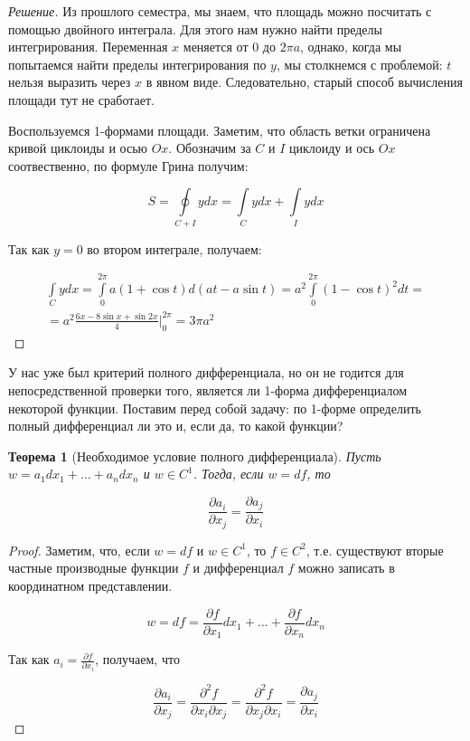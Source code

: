 \documentclass[a5paper]{article}
\newcounter{through}
\theoremstyle{plain}
\newtheorem{theorem}[through]{Теорема}
\theoremstyle{definition}
\numberwithin{through}{section}
\numberwithin{equation}{section}
\begin{document}
\begin{proof}[Решение]
	Из прошлого семестра, мы знаем, что площадь можно посчитать с помощью двойного интеграла. Для этого нам нужно найти пределы интегрирования. Переменная $x$ меняется от $0$ до $2\pi a$, однако, когда мы попытаемся найти пределы интегрирования по $y$, мы столкнемся с проблемой: $t$ нельзя выразить через $x$ в явном виде. Следовательно, старый способ вычисления площади тут не сработает.
	
	Воспользуемся 1-формами площади. Заметим, что область ветки ограничена кривой циклоиды и осью $Ox$. Обозначим за $C$ и $I$ циклоиду и ось $Ox$ соотвественно, по формуле Грина получим:
	
	\begin{equation*}
		S = \oint\limits_{C + I}ydx =\int\limits_{C}ydx + \int\limits_{I}ydx
	\end{equation*}

	Так как $y = 0$ во втором интеграле, получаем:
	
	\begin{multline*}
	\int\limits_{C}ydx = \int\limits_{0}^{2\pi}a(1+\cos t) d(at - a\sin t) = a^2 \int\limits_{0}^{2\pi} (1-\cos t)^2dt = \\= a^2 \frac{6x - 8 \sin x + \sin 2x}{4} \bigg|_0^{2\pi} = 3 \pi a^2
	\end{multline*}
\end{proof}

У нас уже был критерий полного дифференциала, но он не годится для непосредственной проверки того, является ли 1-форма дифференциалом некоторой функции. Поставим перед собой задачу: по 1-форме определить полный дифференциал ли это и, если да, то какой функции?

\begin{theorem}[Необходимое условие полного дифференциала]
	Пусть $w = a_1 dx_1 + \ldots + a_n dx_n$ и $w \in C^1$. Тогда, если $w = df$, то 
	
	\begin{equation*}
		\frac{\partial a_i}{\partial x_j} = \frac{\partial a_j}{\partial x_i}
	\end{equation*}
\end{theorem}

\begin{proof}
	Заметим, что, если $w = df$ и $w \in C^1$, то $f \in C^2$, т.е. существуют вторые частные производные функции $f$ и дифференциал $f$ можно записать в координатном представлении.
	
	\begin{equation*}
		w = df = \frac{\partial f}{\partial x_1} dx_1 + \ldots + \frac{\partial f}{\partial x_n} dx_n
	\end{equation*}
	
	Так как $a_i = \frac{\partial f}{\partial x_i}$, получаем, что
	
	\begin{equation*}
		\frac{\partial a_i}{\partial x_j} = \frac{\partial^2 f}{\partial x_i \partial x_j} = \frac{\partial^2 f}{\partial x_j \partial x_i} = \frac{\partial a_j}{\partial x_i}
	\end{equation*}
\end{proof}
\end{document}
